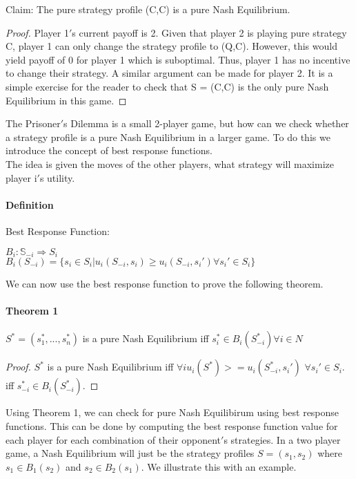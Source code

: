 \documentclass[12pt]{article}
\newcommand{\Definition}{\paragraph{Definition}}
\begin{document}
Claim: The pure strategy profile (C,C) is a pure Nash Equilibrium.

\begin{proof}
Player 1$'$s current payoff is 2. Given that player 2 is playing pure strategy C, player 1 can only change the strategy profile to (Q,C). However, this would yield payoff of 0 for player 1 which is suboptimal. Thus, player 1 has no incentive to change their strategy. A similar argument can be made for player 2.
It is a simple exercise for the reader to check that S = (C,C) is the only pure Nash Equilibrium in this game.

\end{proof}

The Prisoner$'$s Dilemma is a small 2-player game, but how can we check whether a strategy profile is a pure Nash Equilibrium in a larger game. To do this we introduce the concept of best response functions.\\

The idea is given the moves of the other players, what strategy will maximize player i$'$s utility.

\Definition Best Response Function: 
\begin{center}
	$B_i:\mathbb{S}_{-i} \Rightarrow S_i$\\
	$B_i(S_{-i}) = \{s_i \in S_i | u_i(S_{-i},s_i) \geq u_i(S_{-i},s_i') \forall s_i' \in S_i\}$
\end{center}

We can now use the best response function to prove the following theorem.

\paragraph{Theorem 1} $S^* = (s^*_1, ... , s^*_n)$ is a pure Nash Equilibrium iff $s^*_i \in B_i(S^*_{-i}) \forall i \in N$

\begin{proof}
$S^*$ is a pure Nash Equilibrium iff $\forall i u_i(S^*) >= u_i(S^*_{-i}, s_i')$ $\forall s_i' \in S_i$. iff $s^*_{-i} \in B_i(S^*_{-i})$.
\end{proof}

Using Theorem 1, we can check for pure Nash Equilibirum using best response functions. This can be done by computing the best response function value for each player for each combination of their opponent$'$s strategies. In a two player game, a Nash Equilibrium will just be the strategy profiles $S = (s_1, s_2)$ where $s_1 \in B_1(s_2)$ and $s_2 \in B_2(s_1)$. We illustrate this with an example.
\end{document}
